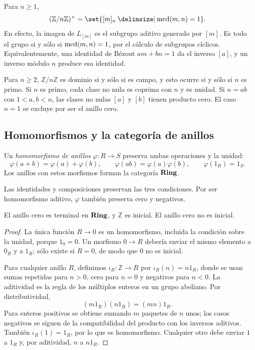 \begin{ejem}
Para $n\geq1$,
\[
(\mathbb Z/n\mathbb Z)^\times
=\set{[m]_n\given \mcd(m,n)=1}.
\]
En efecto, la imagen de $L_{[m]}$ es el subgrupo aditivo generado por $[m]$. Es todo el grupo si y sólo si $\operatorname{mcd}(m,n)=1$, por el cálculo de subgrupos cíclicos. Equivalentemente, una identidad de Bézout $am+bn=1$ da el inverso $[a]$, y un inverso módulo $n$ produce esa identidad.

Para $n\geq2$, $\mathbb Z/n\mathbb Z$ es dominio si y sólo si es campo, y esto ocurre si y sólo si $n$ es primo. Si $n$ es primo, cada clase no nula es coprima con $n$ y es unidad. Si $n=ab$ con $1<a,b<n$, las clases no nulas $[a]$ y $[b]$ tienen producto cero. El caso $n=1$ se excluye por ser el anillo cero.
\end{ejem}

\subsection{Homomorfismos y la categoría de anillos}\label{tema:11-2-2a}
\begin{defi}
Un \emph{homomorfismo de anillos} $\varphi:R\to S$ preserva ambas operaciones y la unidad:
\[
\varphi(a+b)=\varphi(a)+\varphi(b),\qquad
\varphi(ab)=\varphi(a)\varphi(b),\qquad
\varphi(1_R)=1_S.
\]
Los anillos con estos morfismos forman la categoría $\mathbf{Ring}$.
\end{defi}
Las identidades y composiciones preservan las tres condiciones. Por ser homomorfismo aditivo, $\varphi$ también preserva cero y negativos.

\begin{prop}\label{prop:C11-inicial}
El anillo cero es terminal en $\mathbf{Ring}$, y $\mathbb Z$ es inicial. El anillo cero no es inicial.
\end{prop}
\begin{proof}
La única función $R\to0$ es un homomorfismo, incluida la condición sobre la unidad, porque $1_0=0$. Un morfismo $0\to R$ debería enviar el mismo elemento a $0_R$ y a $1_R$; sólo existe si $R=0$, de modo que $0$ no es inicial.

Para cualquier anillo $R$, definimos $\iota_R:\mathbb Z\to R$ por $\iota_R(n)=n1_R$, donde se usan sumas repetidas para $n>0$, cero para $n=0$ y negativos para $n<0$. La aditividad es la regla de los múltiplos enteros en un grupo abeliano. Por distributividad,
\[
(m1_R)(n1_R)=(mn)1_R.
\]
Para enteros positivos se obtiene sumando $m$ paquetes de $n$ unos; los casos negativos se siguen de la compatibilidad del producto con los inversos aditivos. También $\iota_R(1)=1_R$, por lo que es homomorfismo. Cualquier otro debe enviar $1$ a $1_R$ y, por aditividad, $n$ a $n1_R$.
\end{proof}

